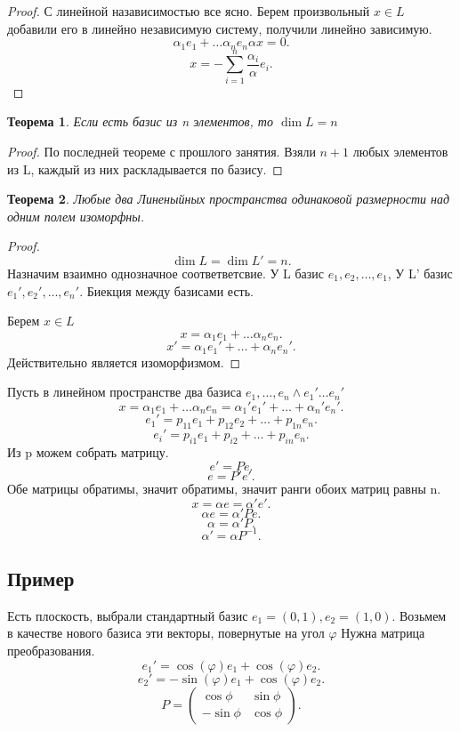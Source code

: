 \documentclass{scrartcl}
\newtheorem{theorem}{Теорема}
\begin{document}
\begin{proof}
    С линейной назависимостью все ясно. Берем произвольный $x \in L$ добавили его в линейно независимую систему, получили линейно зависимую.
     \[
         \alpha_1 e_1 +  \dots \alpha_{n}e_{n} \alpha x= 0
    .\] 
    \[
    x = -\sum_{i = 1}^{n} \frac{\alpha_{i}}{\alpha}e_{i}
    .\] 
\end{proof}
\begin{theorem}
    Если есть базис из n элементов, то $\dim{L} = n$
\end{theorem}
\begin{proof}
    По последней теореме с прошлого занятия. Взяли $n + 1$ любых элементов из L, каждый из них раскладывается по базису.
\end{proof}
\begin{theorem}
    Любые два Линеныйных пространства одинаковой размерности над одним полем изоморфны.
\end{theorem}
\begin{proof}
    \[
        \dim{L} = \dim{L'} = n
    .\] 
    Назначим взаимно однозначное соответветсвие. У L базис $e_1,e_2,\dots,e_1$, У L' базис $e_1',e_2',\dots,e_{n}'$. Биекция между базисами есть.

    Берем $x \in L$ 
     \[
    x = \alpha_1 e_1 + \dots \alpha_{n} e_{n}
    .\] 
    \[
    x' = \alpha_{1} e_1' + \dots + \alpha_{n}e_{n}'
    .\] 
    Действительно является изоморфизмом.
\end{proof}
Пусть в линейном пространстве два базиса $e_1,\dots,e_{n} \land e_1'\dots e_{n}'$ 
\[
x = \alpha_{1}e_1 + \dots \alpha_{n} e_{n} = \alpha_1'e_1' + \dots + \alpha_{n}' e_{n}'
.\] 
\[
e_1' = p_{11}e_1 + p_{12}e_2 + \dots + p_{1n}e_{n}
.\] 
\[
e_{i}' = p_{i1}e_1 + p_{i2} + \dots + p_{in}e_{n}
.\] 
Из p можем собрать матрицу.
\[
e' = P e
.\] 
\[
    e = P'e'
.\] 
Обе матрицы обратимы, значит обратимы, значит ранги обоих матриц равны n.
 \[
x = \alpha e = \alpha' e'
.\] 
\[
\alpha e = \alpha' P e
.\] 
\[
\alpha = \alpha' P
.\] 
\[
\alpha' = \alpha P^{-1}
.\] 
\subsection{Пример}
Есть плоскость, выбрали стандартный базис $e_1 = (0,1), e_2 = (1,0)$. Возьмем в качестве нового базиса эти векторы, повернутые на угол  $\varphi$
Нужна матрица преобразования.
\[
    e_1' = \cos{( \varphi )} e_1 + \cos{( \varphi )} e_2
.\] 
\[
    e_2' = -\sin{(\varphi)} e_1 + \cos{(\varphi)} e_2
.\] 
\[
P = 
\begin{pmatrix} 
    \cos{\phi}  & \sin{\phi}\\
    -\sin{\phi} & \cos{\phi}
\end{pmatrix} 
.\] 
\end{document}
